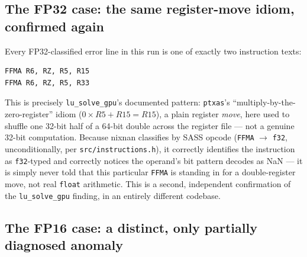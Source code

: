 \documentclass[11pt,a4paper]{article}
\begin{document}
\subsection{The FP32 case: the same register-move idiom, confirmed again}

Every FP32-classified error line in this run is one of exactly two
instruction texts:
\begin{lstlisting}
FFMA R6, RZ, R5, R15
FFMA R6, RZ, R5, R33
\end{lstlisting}
This is precisely \texttt{lu\_solve\_gpu}'s documented pattern:
\texttt{ptxas}'s ``multiply-by-the-zero-register'' idiom
($0\times R5 + R15 = R15$), a plain register \emph{move}, here used to
shuffle one 32-bit half of a 64-bit double across the register file ---
not a genuine 32-bit computation. Because nixnan classifies by SASS
opcode (\texttt{FFMA} $\to$ \texttt{f32}, unconditionally, per
\texttt{src/instructions.h}), it correctly identifies the instruction as
\texttt{f32}-typed and correctly notices the operand's bit pattern
decodes as NaN --- it is simply never told that this particular
\texttt{FFMA} is standing in for a double-register move, not real
\texttt{float} arithmetic. This is a second, independent confirmation of
the \texttt{lu\_solve\_gpu} finding, in an entirely different codebase.

\subsection{The FP16 case: a distinct, only partially diagnosed anomaly}
\end{document}
